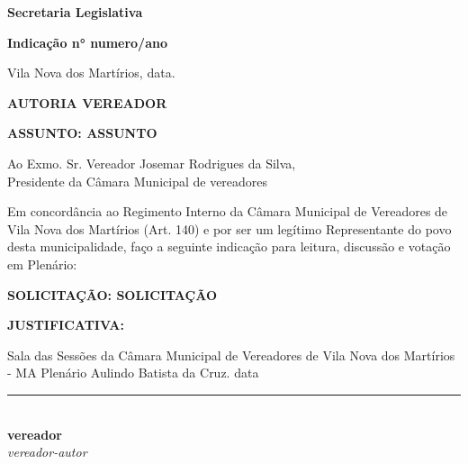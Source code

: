 \documentclass[12pt]{letter} %
\begin{document}
\begin{flushright} %
\textbf{ Secretaria Legislativa } \\ %

\begin{flushleft} %
\textbf{Indicação n° {{numero}}/{{ano}}} %
\end{flushleft}
\vspace{0.6cm} %
Vila Nova dos Martírios, {{data}}. %
\end{flushright}

\vspace{0.6cm}
\begin{flushleft} %
\textbf{AUTORIA \MakeUppercase{ {{vereador}} }}
\end{flushleft}
\vspace{0.3cm}

\begin{justify}
\textbf{ASSUNTO: \MakeUppercase{ {{assunto}} }}
\end{justify}
\vspace{0.3cm}

\begin{justify}
	Ao Exmo. Sr. Vereador Josemar Rodrigues da Silva, \\
	Presidente da Câmara Municipal de vereadores \\
\end{justify}

\begin{justify}
	Em concordância ao Regimento Interno da Câmara Municipal de Vereadores de Vila Nova dos Martírios (Art. 140) e por ser um legítimo Representante do povo desta municipalidade, faço a seguinte indicação para leitura, discussão e votação em Plenário:
\end{justify}

\vspace{0.3cm}
\begin{justify}
	\MakeUppercase{\textbf{SOLICITAÇÃO: {{solicitação}} }}
\end{justify}

\vspace{0.3cm}
\begin{justify}
	\textbf{JUSTIFICATIVA:} 
\end{justify}

\vspace{0.3cm}
\begin{justify}
		Sala das Sessões da Câmara Municipal de Vereadores de Vila Nova dos Martírios - MA Plenário Aulindo Batista da Cruz. {{data}}
\end{justify}

\vspace{1.3cm}

\begin{center}
\rule{8cm}{0.4pt} \\[1ex]
\textbf{ {{vereador}} } \\[0.5ex]
\textit{ {{vereador-autor}} }
\end{center}
\end{document}
